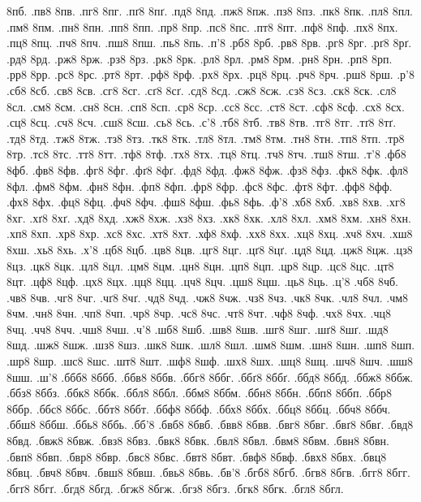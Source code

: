 {8пб.
.пв8
8пв.
.пг8
8пг.
.пґ8
8пґ.
.пд8
8пд.
.пж8
8пж.
.пз8
8пз.
.пк8
8пк.
.пл8
8пл.
.пм8
8пм.
.пн8
8пн.
.пп8
8пп.
.пр8
8пр.
.пс8
8пс.
.пт8
8пт.
.пф8
8пф.
.пх8
8пх.
.пц8
8пц.
.пч8
8пч.
.пш8
8пш.
.пь8
8пь.
.п'8
.рб8
8рб.
.рв8
8рв.
.рг8
8рг.
.рґ8
8рґ.
.рд8
8рд.
.рж8
8рж.
.рз8
8рз.
.рк8
8рк.
.рл8
8рл.
.рм8
8рм.
.рн8
8рн.
.рп8
8рп.
.рр8
8рр.
.рс8
8рс.
.рт8
8рт.
.рф8
8рф.
.рх8
8рх.
.рц8
8рц.
.рч8
8рч.
.рш8
8рш.
.р'8
.сб8
8сб.
.св8
8св.
.сг8
8сг.
.сґ8
8сґ.
.сд8
8сд.
.сж8
8сж.
.сз8
8сз.
.ск8
8ск.
.сл8
8сл.
.см8
8см.
.сн8
8сн.
.сп8
8сп.
.ср8
8ср.
.сс8
8сс.
.ст8
8ст.
.сф8
8сф.
.сх8
8сх.
.сц8
8сц.
.сч8
8сч.
.сш8
8сш.
.сь8
8сь.
.с'8
.тб8
8тб.
.тв8
8тв.
.тг8
8тг.
.тґ8
8тґ.
.тд8
8тд.
.тж8
8тж.
.тз8
8тз.
.тк8
8тк.
.тл8
8тл.
.тм8
8тм.
.тн8
8тн.
.тп8
8тп.
.тр8
8тр.
.тс8
8тс.
.тт8
8тт.
.тф8
8тф.
.тх8
8тх.
.тц8
8тц.
.тч8
8тч.
.тш8
8тш.
.т'8
.фб8
8фб.
.фв8
8фв.
.фг8
8фг.
.фґ8
8фґ.
.фд8
8фд.
.фж8
8фж.
.фз8
8фз.
.фк8
8фк.
.фл8
8фл.
.фм8
8фм.
.фн8
8фн.
.фп8
8фп.
.фр8
8фр.
.фс8
8фс.
.фт8
8фт.
.фф8
8фф.
.фх8
8фх.
.фц8
8фц.
.фч8
8фч.
.фш8
8фш.
.фь8
8фь.
.ф'8
.хб8
8хб.
.хв8
8хв.
.хг8
8хг.
.хґ8
8хґ.
.хд8
8хд.
.хж8
8хж.
.хз8
8хз.
.хк8
8хк.
.хл8
8хл.
.хм8
8хм.
.хн8
8хн.
.хп8
8хп.
.хр8
8хр.
.хс8
8хс.
.хт8
8хт.
.хф8
8хф.
.хх8
8хх.
.хц8
8хц.
.хч8
8хч.
.хш8
8хш.
.хь8
8хь.
.х'8
.цб8
8цб.
.цв8
8цв.
.цг8
8цг.
.цґ8
8цґ.
.цд8
8цд.
.цж8
8цж.
.цз8
8цз.
.цк8
8цк.
.цл8
8цл.
.цм8
8цм.
.цн8
8цн.
.цп8
8цп.
.цр8
8цр.
.цс8
8цс.
.цт8
8цт.
.цф8
8цф.
.цх8
8цх.
.цц8
8цц.
.цч8
8цч.
.цш8
8цш.
.ць8
8ць.
.ц'8
.чб8
8чб.
.чв8
8чв.
.чг8
8чг.
.чґ8
8чґ.
.чд8
8чд.
.чж8
8чж.
.чз8
8чз.
.чк8
8чк.
.чл8
8чл.
.чм8
8чм.
.чн8
8чн.
.чп8
8чп.
.чр8
8чр.
.чс8
8чс.
.чт8
8чт.
.чф8
8чф.
.чх8
8чх.
.чц8
8чц.
.чч8
8чч.
.чш8
8чш.
.ч'8
.шб8
8шб.
.шв8
8шв.
.шг8
8шг.
.шґ8
8шґ.
.шд8
8шд.
.шж8
8шж.
.шз8
8шз.
.шк8
8шк.
.шл8
8шл.
.шм8
8шм.
.шн8
8шн.
.шп8
8шп.
.шр8
8шр.
.шс8
8шс.
.шт8
8шт.
.шф8
8шф.
.шх8
8шх.
.шц8
8шц.
.шч8
8шч.
.шш8
8шш.
.ш'8
.ббб8
8ббб.
.ббв8
8ббв.
.ббг8
8ббг.
.ббґ8
8ббґ.
.ббд8
8ббд.
.ббж8
8ббж.
.ббз8
8ббз.
.ббк8
8ббк.
.ббл8
8ббл.
.ббм8
8ббм.
.ббн8
8ббн.
.ббп8
8ббп.
.ббр8
8ббр.
.ббс8
8ббс.
.ббт8
8ббт.
.ббф8
8ббф.
.ббх8
8ббх.
.ббц8
8ббц.
.ббч8
8ббч.
.ббш8
8ббш.
.ббь8
8ббь.
.бб'8
.бвб8
8бвб.
.бвв8
8бвв.
.бвг8
8бвг.
.бвґ8
8бвґ.
.бвд8
8бвд.
.бвж8
8бвж.
.бвз8
8бвз.
.бвк8
8бвк.
.бвл8
8бвл.
.бвм8
8бвм.
.бвн8
8бвн.
.бвп8
8бвп.
.бвр8
8бвр.
.бвс8
8бвс.
.бвт8
8бвт.
.бвф8
8бвф.
.бвх8
8бвх.
.бвц8
8бвц.
.бвч8
8бвч.
.бвш8
8бвш.
.бвь8
8бвь.
.бв'8
.бгб8
8бгб.
.бгв8
8бгв.
.бгг8
8бгг.
.бгґ8
8бгґ.
.бгд8
8бгд.
.бгж8
8бгж.
.бгз8
8бгз.
.бгк8
8бгк.
.бгл8
8бгл.
}
